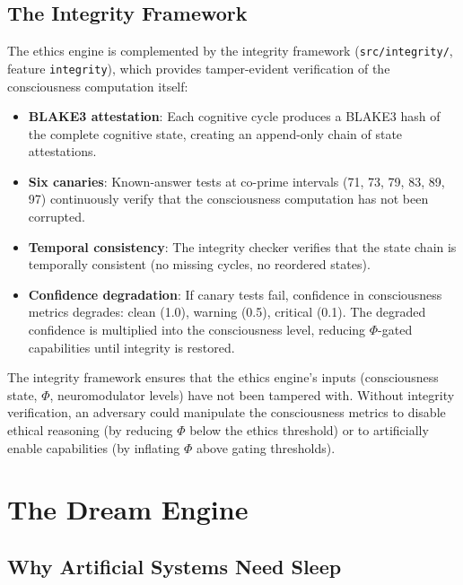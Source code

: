 \documentclass[12pt]{book}
\begin{document}
\section{The Integrity Framework}

The ethics engine is complemented by the integrity framework (\texttt{src/integrity/}, feature \texttt{integrity}), which provides tamper-evident verification of the consciousness computation itself:

\begin{itemize}
  \item \textbf{BLAKE3 attestation}: Each cognitive cycle produces a BLAKE3 hash of the complete cognitive state, creating an append-only chain of state attestations.
  \item \textbf{Six canaries}: Known-answer tests at co-prime intervals (71, 73, 79, 83, 89, 97) continuously verify that the consciousness computation has not been corrupted.
  \item \textbf{Temporal consistency}: The integrity checker verifies that the state chain is temporally consistent (no missing cycles, no reordered states).
  \item \textbf{Confidence degradation}: If canary tests fail, confidence in consciousness metrics degrades: clean (1.0), warning (0.5), critical (0.1). The degraded confidence is multiplied into the consciousness level, reducing $\Phi$-gated capabilities until integrity is restored.
\end{itemize}

The integrity framework ensures that the ethics engine's inputs (consciousness state, $\Phi$, neuromodulator levels) have not been tampered with. Without integrity verification, an adversary could manipulate the consciousness metrics to disable ethical reasoning (by reducing $\Phi$ below the ethics threshold) or to artificially enable capabilities (by inflating $\Phi$ above gating thresholds).


\chapter{The Dream Engine}
\label{ch:dream}

\section{Why Artificial Systems Need Sleep}
\end{document}
